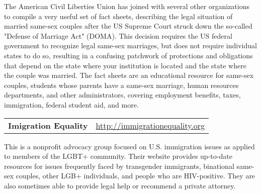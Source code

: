 The American Civil Liberties Union has joined with several other organizations to compile a very useful set of fact sheets, describing the legal situation of married same-sex couples after the US Supreme Court struck down the so-called "Defense of Marriage Act" (DOMA). This decision requires the US federal government to recognize legal same-sex marriages, but does not require individual states to do so, resulting in a confusing patchwork of protections and obligations that depend on the state where your institution is located and the state where the couple was married. The fact sheets are an educational resource for same-sex couples, students whose parents have a same-sex marriage, human resources departments, and other administrators, covering employment benefits, taxes, immigration, federal student aid, and more.


\vspace*{\baselineskip}
\noindent\begin{tabular*}{\textwidth}{@{\extracolsep{\fill}}lr}
	\textbf{Imigration Equality} & \href{http://immigrationequality.org}{http://immigrationequality.org}	
\end{tabular*}
This is a nonprofit advocacy group focused on U.S. immigration issues as applied to members of the LGBT+ community. Their website provides up-to-date resources for issues frequently faced by transgender immigrants, binational same-sex couples, other LGB+ individuals, and people who are HIV-positive. They are also sometimes able to provide legal help or recommend a private attorney.


